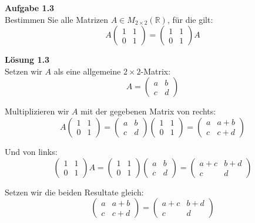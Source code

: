 \documentclass[%
    12pt,
    a4paper,
    ngerman,
    headheight=29.1pt,
]{scrartcl}
\newcommand{\Aufgabe}[1]{
  {
  \vspace*{0.5cm}
  \textsf{\textbf{Aufgabe #1}}
  \vspace*{0.2cm}
  }
}
\newcommand{\Loesung}[1]{
  {
  \vspace*{0.5cm}
  \textsf{\textbf{Lösung #1}}
  \vspace*{0.2cm}
  }
}
\begin{document}
\Aufgabe{1.3}\\
Bestimmen Sie alle Matrizen \( A \in M_{2 \times 2}(\mathbb{R}) \), für die gilt:
\[
A \begin{pmatrix}
1 & 1 \\
0 & 1
\end{pmatrix}
=
\begin{pmatrix}
1 & 1 \\
0 & 1
\end{pmatrix}
A
\]
\Loesung{1.3} \\
Setzen wir \( A \) als eine allgemeine \( 2 \times 2 \)-Matrix:
\[
A = \begin{pmatrix}
a & b \\
c & d
\end{pmatrix}
\]

Multiplizieren wir \( A \) mit der gegebenen Matrix von rechts:
\[
A \begin{pmatrix}
1 & 1 \\
0 & 1
\end{pmatrix}
=
\begin{pmatrix}
a & b \\
c & d
\end{pmatrix}
\begin{pmatrix}
1 & 1 \\
0 & 1
\end{pmatrix}
=
\begin{pmatrix}
a & a+b \\
c & c+d
\end{pmatrix}
\]

Und von links:
\[
\begin{pmatrix}
1 & 1 \\
0 & 1
\end{pmatrix}
A
=
\begin{pmatrix}
1 & 1 \\
0 & 1
\end{pmatrix}
\begin{pmatrix}
a & b \\
c & d
\end{pmatrix}
=
\begin{pmatrix}
a+c & b+d \\
c & d
\end{pmatrix}
\]

Setzen wir die beiden Resultate gleich:
\[
\begin{pmatrix}
a & a+b \\
c & c+d
\end{pmatrix}
=
\begin{pmatrix}
a+c & b+d \\
c & d
\end{pmatrix}
\]
\end{document}
